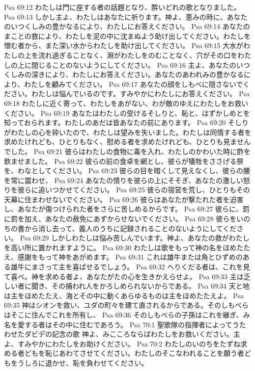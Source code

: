 Psa 69:12  わたしは門に座する者の話題となり、酔いどれの歌となりました。
Psa 69:13  しかし主よ、わたしはあなたに祈ります。神よ、恵みの時に、あなたのいつくしみの豊かなるにより、わたしにお答えください。
Psa 69:14  あなたのまことの救により、わたしを泥の中に沈まぬよう助け出してください。わたしを憎む者から、また深い水からわたしを助け出してください。
Psa 69:15  大水がわたしの上を流れ過ぎることなく、淵がわたしをのむことなく、穴がその口をわたしの上に閉じることのないようにしてください。
Psa 69:16  主よ、あなたのいつくしみの深きにより、わたしにお答えください。あなたのあわれみの豊かなるにより、わたしを顧みてください。
Psa 69:17  あなたの顔をしもべに隠さないでください。わたしは悩んでいるのです。すみやかにわたしにお答えください。
Psa 69:18  わたしに近く寄って、わたしをあがない、わが敵のゆえにわたしをお救いください。
Psa 69:19  あなたはわたしの受けるそしりと、恥と、はずかしめとを知っておられます。わたしのあだは皆あなたの前にあります。
Psa 69:20  そしりがわたしの心を砕いたので、わたしは望みを失いました。わたしは同情する者を求めたけれども、ひとりもなく、慰める者を求めたけれども、ひとりも見ませんでした。
Psa 69:21  彼らはわたしの食物に毒を入れ、わたしのかわいた時に酢を飲ませました。
Psa 69:22  彼らの前の食卓を網とし、彼らが犠牲をささげる祭を、わなとしてください。
Psa 69:23  彼らの目を暗くして見えなくし、彼らの腰を常に震わせ、
Psa 69:24  あなたの憤りを彼らの上にそそぎ、あなたの激しい怒りを彼らに追いつかせてください。
Psa 69:25  彼らの宿営を荒し、ひとりもその天幕に住まわせないでください。
Psa 69:26  彼らはあなたが撃たれた者を迫害し、あなたが傷つけられた者をさらに苦しめるからです。
Psa 69:27  彼らに、罰に罰を加え、あなたの赦免にあずからせないでください。
Psa 69:28  彼らをいのちの書から消し去って、義人のうちに記録されることのないようにしてください。
Psa 69:29  しかしわたしは悩み苦しんでいます。神よ、あなたの救がわたしを高い所に置かれますように。
Psa 69:30  わたしは歌をもって神の名をほめたたえ、感謝をもって神をあがめます。
Psa 69:31  これは雄牛または角とひずめのある雄牛にまさって主を喜ばせるでしょう。
Psa 69:32  へりくだる者は、これを見て喜べ。神を求める者よ、あなたがたの心を生きかえらせよ。
Psa 69:33  主は乏しい者に聞き、その捕われ人をかろしめられないからである。
Psa 69:34  天と地は主をほめたたえ、海とその中に動くあらゆるものは主をほめたたえよ。
Psa 69:35  神はシオンを救い、ユダの町々を建て直されるからである。そのしもべらはそこに住んでこれを所有し、
Psa 69:36  そのしもべらの子孫はこれを継ぎ、み名を愛する者はその中に住むであろう。
Psa 70:1  聖歌隊の指揮者によってうたわせたダビデの記念の歌 神よ、みこころならばわたしをお救いください。主よ、すみやかにわたしをお助けください。
Psa 70:2  わたしのいのちをたずね求める者どもを恥じあわてさせてください。わたしのそこなわれることを願う者どもをうしろに退かせ、恥を負わせてください。

